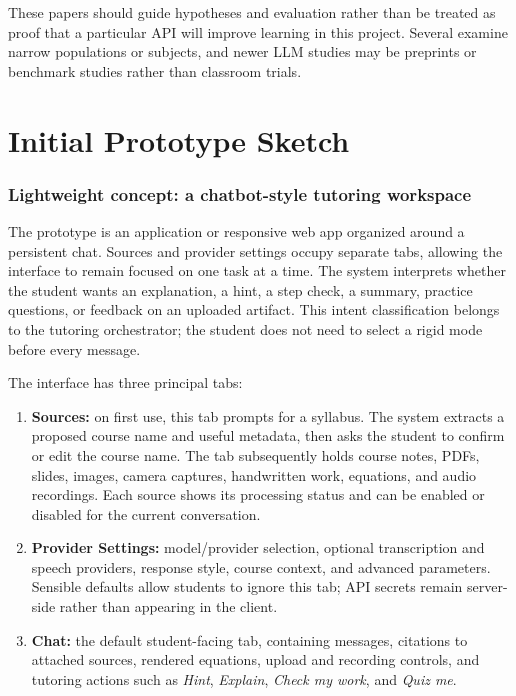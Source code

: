 \documentclass[11pt]{article}
\begin{document}
These papers should guide hypotheses and evaluation rather than be treated as proof that a particular API will improve learning in this project. Several examine narrow populations or subjects, and newer LLM studies may be preprints or benchmark studies rather than classroom trials.

\clearpage
\part{Initial Prototype Sketch}

\section{Lightweight concept: a chatbot-style tutoring workspace}
The prototype is an application or responsive web app organized around a persistent chat. Sources and provider settings occupy separate tabs, allowing the interface to remain focused on one task at a time. The system interprets whether the student wants an explanation, a hint, a step check, a summary, practice questions, or feedback on an uploaded artifact. This intent classification belongs to the tutoring orchestrator; the student does not need to select a rigid mode before every message.

The interface has three principal tabs:
\begin{enumerate}
\item \textbf{Sources:} on first use, this tab prompts for a syllabus. The system extracts a proposed course name and useful metadata, then asks the student to confirm or edit the course name. The tab subsequently holds course notes, PDFs, slides, images, camera captures, handwritten work, equations, and audio recordings. Each source shows its processing status and can be enabled or disabled for the current conversation.
\item \textbf{Provider Settings:} model/provider selection, optional transcription and speech providers, response style, course context, and advanced parameters. Sensible defaults allow students to ignore this tab; API secrets remain server-side rather than appearing in the client.
\item \textbf{Chat:} the default student-facing tab, containing messages, citations to attached sources, rendered equations, upload and recording controls, and tutoring actions such as \emph{Hint}, \emph{Explain}, \emph{Check my work}, and \emph{Quiz me}.
\end{enumerate}
\end{document}

